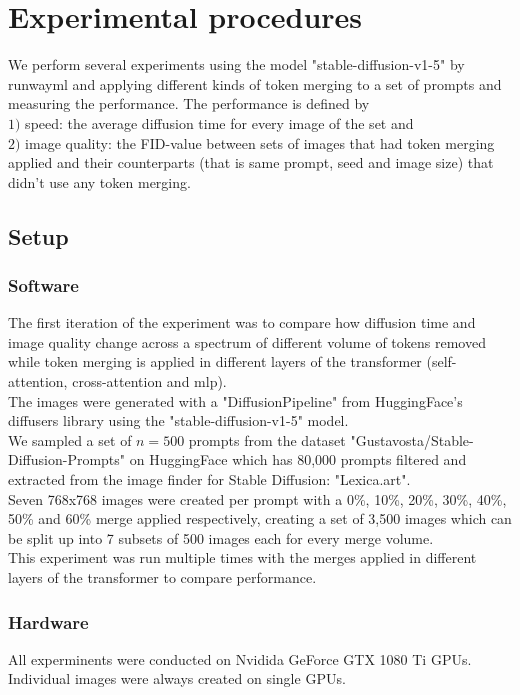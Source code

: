 \section{Experimental procedures}
We perform several experiments using the model "stable-diffusion-v1-5" by runwayml\cite{Rombach_2022_CVPR} and applying different kinds of token merging to a set of prompts and measuring the performance.
The performance is defined by\\ 
\(1)\) speed: the average diffusion time for every image of the set and\\
\(2)\) image quality: the FID-value between sets of images that had token merging applied and their counterparts (that is same prompt, seed and image size) that didn't use any token merging.

\subsection{Setup}
\subsubsection*{Software}
The first iteration of the experiment was to compare how diffusion time and image quality change across a spectrum of different volume of tokens  removed while token merging is applied in different layers of the transformer (self-attention, cross-attention and mlp).\\
The images were generated with a "DiffusionPipeline" from HuggingFace's diffusers library using the "stable-diffusion-v1-5" model\cite{Rombach_2022_CVPR}.\\
We sampled a set of \(n=500\) prompts from the dataset "Gustavosta/Stable-Diffusion-Prompts" on HuggingFace which has 80,000 prompts filtered and extracted from the image finder for Stable Diffusion: "Lexica.art".\\
Seven 768x768 images were created per prompt with a 0\%, 10\%, 20\%, 30\%, 40\%, 50\% and 60\% merge applied respectively, creating a set of 3,500 images which can be split up into 7 subsets of 500 images each for every merge volume.\\
This experiment was run multiple times with the merges applied in different layers of the transformer to compare performance.

\subsubsection*{Hardware}
All experminents were conducted on Nvidida GeForce GTX 1080 Ti GPUs. Individual images were always created on single GPUs.

